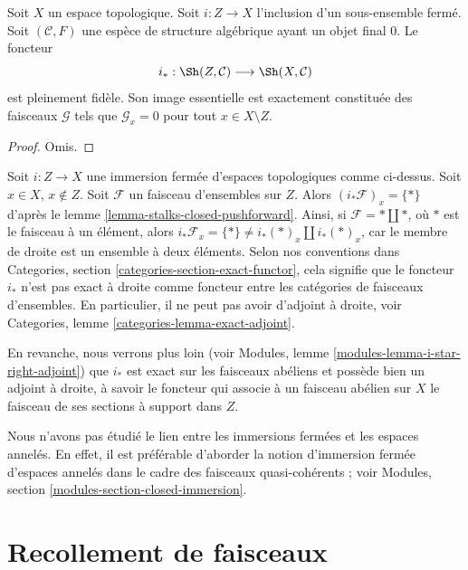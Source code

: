 \begin{lemma}
\label{lemma-equivalence-categories-closed-structures}
Soit $X$ un espace topologique.
Soit $i : Z \to X$ l'inclusion d'un sous-ensemble fermé.
Soit $(\mathcal{C}, F)$ une espèce de structure algébrique
ayant un objet final $0$. Le foncteur
$$
i_* : \Sh(Z, \mathcal{C}) \longrightarrow \Sh(X, \mathcal{C})
$$
est pleinement fidèle. Son image essentielle est exactement constituée
des faisceaux $\mathcal{G}$ tels que
$\mathcal{G}_x = 0$ pour tout $x \in X \setminus Z$.
\end{lemma}

\begin{proof}
Omis.
\end{proof}

\begin{remark}
\label{remark-i-star-not-exact}
Soit $i : Z \to X$ une immersion fermée d'espaces topologiques comme
ci-dessus. Soit $x \in X$, $x \not \in Z$. Soit $\mathcal{F}$ un faisceau
d'ensembles sur $Z$. Alors $(i_*\mathcal{F})_x = \{ * \}$
d'après le lemme \ref{lemma-stalks-closed-pushforward}.
Ainsi, si $\mathcal{F} = * \amalg *$, où
$*$ est le faisceau à un élément, alors
$i_*\mathcal{F}_x = \{*\} \not = i_*(*)_x \amalg i_*(*)_x$,
car le membre de droite est un ensemble à deux éléments.
Selon nos conventions dans
Categories, section \ref{categories-section-exact-functor},
cela signifie que le foncteur $i_*$ n'est pas exact à droite
comme foncteur entre les catégories de faisceaux d'ensembles.
En particulier, il ne peut pas avoir d'adjoint à droite, voir
Categories, lemme \ref{categories-lemma-exact-adjoint}.

\medskip\noindent
En revanche, nous verrons plus loin (voir
Modules, lemme \ref{modules-lemma-i-star-right-adjoint})
que $i_*$ est exact sur les faisceaux abéliens et possède bien un adjoint
à droite, à savoir le foncteur qui associe à un faisceau abélien sur $X$
le faisceau de ses sections à support dans $Z$.
\end{remark}

\begin{remark}
\label{remark-closed-immersion-spaces}
Nous n'avons pas étudié le lien entre les immersions fermées et les
espaces annelés. En effet, il est préférable d'aborder la notion
d'immersion fermée d'espaces annelés dans le cadre des faisceaux
quasi-cohérents ; voir Modules, section
\ref{modules-section-closed-immersion}.
\end{remark}

\section{Recollement de faisceaux}
\label{section-glueing-sheaves}

